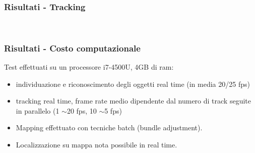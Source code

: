 \documentclass[c]{beamer}
\begin{document}
\begin{frame}
\frametitle{Risultati - Tracking}
 \\
\vskip -0.5cm
\end{frame}


\begin{frame}
\frametitle{Risultati - Costo computazionale}

Test effettuati su un processore i7-4500U, 4GB di ram:

\begin{itemize}
 \item individuazione e riconoscimento degli oggetti real time (in media 20/25 fps)
 \item tracking real time, frame rate medio dipendente dal numero di track seguite in parallelo (1 $\sim$20 fps, 10 $\sim$5 fps) 
 \item Mapping effettuato con tecniche batch (bundle adjustment).
 \item Localizzazione su mappa nota possibile in real time.
\end{itemize}

\end{frame}
\end{document}
